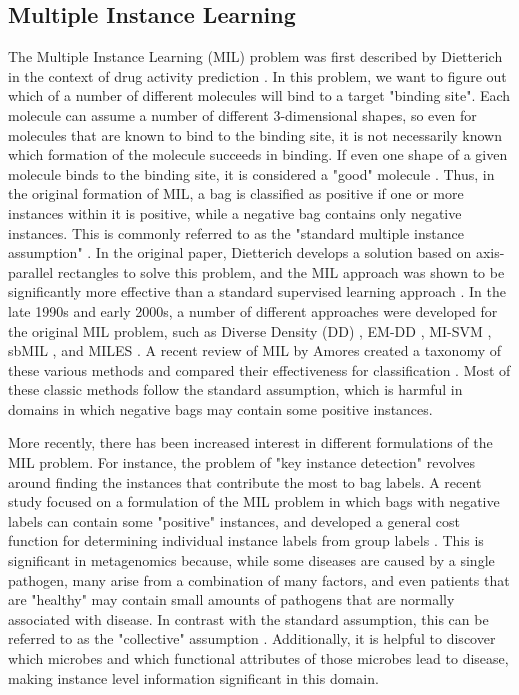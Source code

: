 
\subsection{Multiple Instance Learning}

The Multiple Instance Learning (MIL) problem was first described by Dietterich in the context of drug activity prediction \cite{dietterich97}. In this problem, we want to figure out which of a number of different molecules will bind to a target "binding site". Each molecule can assume a number of different 3-dimensional shapes, so even for molecules that are known to bind to the binding site, it is not necessarily known which formation of the molecule succeeds in binding. If even one shape of a given molecule binds to the binding site, it is considered a "good" molecule \cite{dietterich97}. Thus, in the original formation of MIL, a bag is classified as positive if one or more instances within it is positive, while a negative bag contains only negative instances. This is commonly referred to as the "standard multiple instance assumption" \cite{amores13}. In the original paper, Dietterich develops a solution based on axis-parallel rectangles to solve this problem, and the MIL approach was shown to be significantly more effective than a standard supervised learning approach \cite{dietterich97}. In the late 1990s and early 2000s, a number of different approaches were developed for the original MIL problem, such as Diverse Density (DD) \cite{perez98}, EM-DD \cite{zhang01}, MI-SVM \cite{andrews02}, sbMIL \cite{bunescu07}, and MILES \cite{wang06}. A recent review of MIL by Amores created a taxonomy of these various methods and compared their effectiveness for classification \cite{amores13}. Most of these classic methods follow the standard assumption, which is harmful in domains in which negative bags may contain some positive instances.
%

More recently, there has been increased interest in different formulations of the MIL problem. For instance, the problem of "key instance detection" \cite{zhou12} revolves around finding the instances that contribute the most to bag labels. A recent study focused on a formulation of the MIL problem in which bags with negative labels can contain some "positive" instances, and developed a general cost function for determining individual instance labels from group labels \cite{kotzias15}. This is significant in metagenomics because, while some diseases are caused by a single pathogen, many arise from a combination of many factors, and even patients that are "healthy" may contain small amounts of pathogens that are normally associated with disease. In contrast with the standard assumption, this can be referred to as the "collective" assumption \cite{amores13}. Additionally, it is helpful to discover which microbes and which functional attributes of those microbes lead to disease, making instance level information significant in this domain.
%

